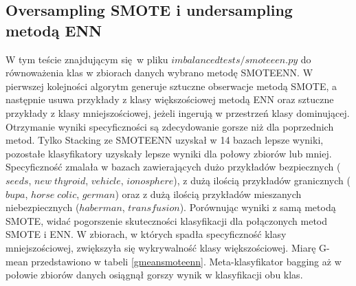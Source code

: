 \subsection{Oversampling SMOTE i undersampling metodą ENN}
W tym teście znajdującym się w pliku $imbalancedtests/smoteeen.py$ do równoważenia klas w zbiorach danych wybrano metodę SMOTEENN. W pierwszej kolejności algorytm generuje sztuczne obserwacje metodą SMOTE, a następnie usuwa przykłady z klasy większościowej metodą ENN oraz sztuczne przykłady z klasy mniejszościowej, jeżeli ingerują w przestrzeń klasy dominującej. Otrzymanie wyniki specyficzności są zdecydowanie gorsze niż dla poprzednich metod. Tylko Stacking ze SMOTEENN uzyskał w 14 bazach lepsze wyniki, pozostałe klasyfikatory uzyskały lepsze wyniki dla połowy zbiorów lub mniej. Specyficzność zmalała w bazach zawierających dużo przykładów bezpiecznych ($seeds$, $new\; thyroid$, $vehicle$, $ionosphere$), z dużą ilością przykładów granicznych ($bupa$, $horse\; colic$, $german$) oraz z dużą ilością przykładów mieszanych niebezpiecznych ($haberman$, $transfusion$). Porównując wyniki z samą metodą SMOTE, widać pogorszenie skuteczności klasyfikacji dla połączonych metod SMOTE i ENN.
W zbiorach, w których spadła specyficzność klasy mniejszościowej, zwiększyła się wykrywalność klasy większościowej. Miarę G-mean przedstawiono w tabeli \ref{gmeansmoteenn}. Meta-klasyfikator bagging aż w połowie zbiorów danych osiągnął gorszy wynik w klasyfikacji obu klas.
